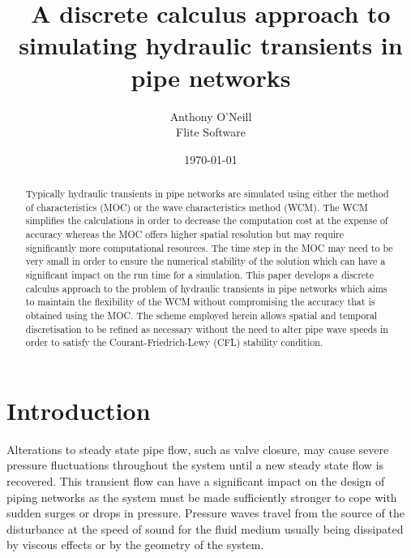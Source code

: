\documentclass[12pt]{article}
\title{A discrete calculus approach to simulating hydraulic transients in pipe networks}
\author{Anthony O'Neill  \\
	Flite Software  \\
	}
\date{\today}
\begin{document}
\maketitle

\begin{abstract}
Typically hydraulic transients in pipe networks are simulated using either the method of characteristics (MOC) or the wave characteristics method (WCM). The WCM simplifies the calculations in order to decrease the computation cost at the expense of accuracy whereas the MOC offers higher spatial resolution but may require significantly more computational resources. The time step in the MOC may need to be very small in order to ensure the numerical stability of the solution which can have a significant impact on the run time for a simulation. This paper develops a discrete calculus approach to the problem of hydraulic transients in pipe networks which aims to maintain the flexibility of the WCM without compromising the accuracy that is obtained using the MOC. The scheme employed herein allows spatial and temporal discretisation to be refined as necessary without the need to alter pipe wave speeds in order to satisfy the Courant-Friedrich-Lewy (CFL) stability condition.
\end{abstract}

\section{Introduction} \label{sec:introduction}

Alterations to steady state pipe flow, such as valve closure, may cause severe pressure fluctuations throughout the system until a new steady state flow is recovered. This transient flow can have a significant impact on the design of piping networks as the system must be made sufficiently stronger to cope with sudden surges or drops in pressure. Pressure waves travel from the source of the disturbance at the speed of sound for the fluid medium usually being dissipated by viscous effects or by the geometry of the system. 
\end{document}
